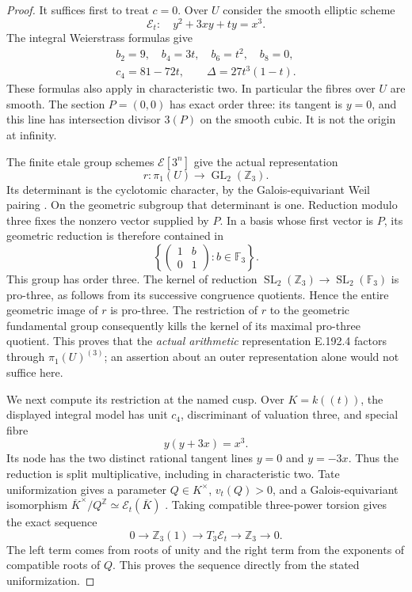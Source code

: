 \begin{proof}
It suffices first to treat \(c=0\).  Over \(U\) consider the smooth
elliptic scheme
\[
                  \mathcal E_t:\quad y^2+3xy+t y=x^3 .
\tag{E.192.2}
\]
The integral Weierstrass formulas give
\[
 \begin{gathered}
 b_2=9,\quad b_4=3t,\quad b_6=t^2,\quad b_8=0,\\
 c_4=81-72t,\qquad
 \Delta=27t^3(1-t).
 \end{gathered}
\tag{E.192.3}
\]
These formulas also apply in characteristic two.  In particular the
fibres over \(U\) are smooth.  The section \(P=(0,0)\) has exact order
three: its tangent is \(y=0\), and this line has intersection divisor
\(3(P)\) on the smooth cubic.  It is not the origin at infinity.

The finite etale group schemes \(\mathcal E[3^n]\) give the actual
representation
\[
       r:\pi_1(U)\longrightarrow
                    \operatorname{GL}_2(\mathbb Z_3).
\tag{E.192.4}
\]
Its determinant is the cyclotomic character, by the Galois-equivariant
Weil pairing
\citep[III.8, Proposition 8.3, pp.97--98]{AuditSilverman2009}.
On the geometric subgroup that determinant is one.  Reduction modulo
three fixes the nonzero vector supplied by \(P\).  In a basis whose
first vector is \(P\), its geometric reduction is therefore contained in
\[
       \left\{\begin{pmatrix}1&b\\0&1\end{pmatrix}:
                      b\in\mathbb F_3\right\}.
\tag{E.192.5}
\]
This group has order three.  The kernel of reduction
\(\operatorname{SL}_2(\mathbb Z_3)\to
\operatorname{SL}_2(\mathbb F_3)\) is pro-three, as follows from its
successive congruence quotients.  Hence the entire geometric image of
\(r\) is pro-three.  The restriction of \(r\) to the geometric
fundamental group consequently kills the kernel of its maximal
pro-three quotient.  This proves that the \emph{actual arithmetic}
representation E.192.4 factors through \(\pi_1(U)^{(3)}\); an assertion
about an outer representation alone would not suffice here.

We next compute its restriction at the named cusp.  Over
\(K=k((t))\), the displayed integral model has unit \(c_4\),
discriminant of valuation three, and special fibre
\[
                         y(y+3x)=x^3 .
\tag{E.192.6}
\]
Its node has the two distinct rational tangent lines \(y=0\) and
\(y=-3x\).  Thus the reduction is split multiplicative, including in
characteristic two.  Tate uniformization gives a parameter
\(Q\in K^\times\), \(v_t(Q)>0\), and a Galois-equivariant
isomorphism \(\overline K^\times/Q^{\mathbb Z}
\simeq\mathcal E_t(\overline K)\)
\citep[C.14, Theorem 14.1(a)--(b), pp.444--445]{AuditSilverman2009}.
Taking compatible three-power torsion gives the exact sequence
\[
 0\longrightarrow\mathbb Z_3(1)
   \longrightarrow T_3\mathcal E_t
   \longrightarrow\mathbb Z_3\longrightarrow0.
\tag{E.192.7}
\]
The left term comes from roots of unity and the right term from the
exponents of compatible roots of \(Q\).  This proves the sequence
directly from the stated uniformization.


\end{proof}
